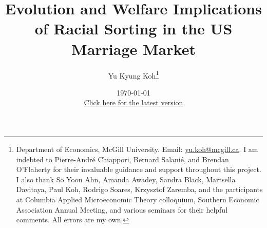 
\renewcommand{\labelitemi}{$\bullet$}
\renewcommand{\labelitemii}{$\bullet$}
\setlength\parindent{20pt}
\newcommand*{\mymatrix}[1]{%
  \ensuremath{\left[\begin{tabular}{@{}l@{}} #1 \end{tabular}\right]}}
\newenvironment{fignote}{\begin{quote}\footnotesize}{\end{quote}}
\renewcommand{\footnoterule}{\vfill\kern -3pt \hrule width 0.4\columnwidth \kern 2.6pt}
\usepackage{fourier}
\usepackage[T1]{fontenc}



	
	
\clearpage

\title{\Large Evolution and Welfare Implications of Racial Sorting in the US Marriage Market}
\author{Yu Kyung Koh\footnote{Department of Economics, McGill University. Email: \href{mailto:yu.koh@mcgill.ca}{yu.koh@mcgill.ca}. I am indebted to Pierre-Andr\'e Chiappori, Bernard Salani\'e, and Brendan O'Flaherty for their invaluable guidance and support throughout this project. I also thank So Yoon Ahn, Amanda Awadey, Sandra Black, Martsella Davitaya, Paul Koh, Rodrigo Soares, Krzysztof Zaremba, and the participants at Columbia Applied Microeconomic Theory colloquium, Southern Economic Association Annual Meeting, and various seminars for their helpful comments. All errors are my own.}}
\date{\today \\ \vspace{5mm} \href{https://yukyungkoh.github.io/files/Koh_interracial-marriage-paper.pdf}{Click here for the latest version} }

\maketitle
\onehalfspacing

